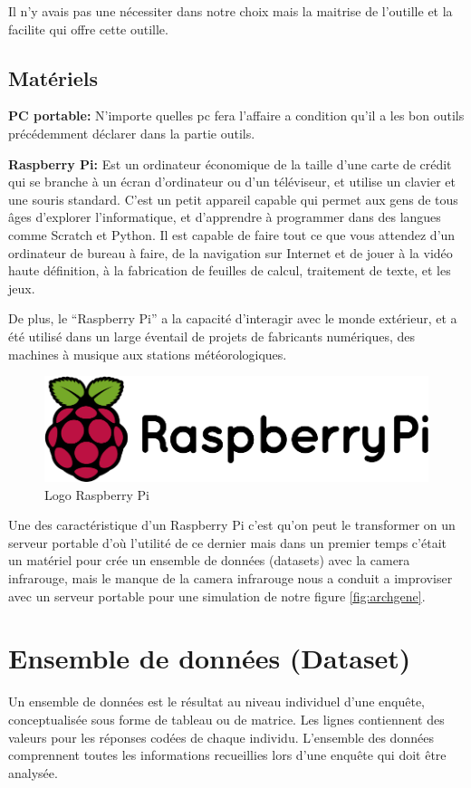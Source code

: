 \documentclass[12pt]{article}
\begin{document}
Il n’y avais pas une nécessiter dans notre choix mais la maitrise de l’outille et la facilite qui offre cette outille.
\subsection{Matériels}
\textbf{PC portable:} N’importe quelles pc fera l’affaire a condition qu’il a les bon outils précédemment déclarer dans la partie outils.

\textbf{Raspberry Pi:} Est un ordinateur économique de la taille d’une carte de crédit qui se branche à un écran d’ordinateur ou d’un téléviseur, et utilise un clavier et une souris standard. C’est un petit appareil capable qui permet aux gens de tous âges d’explorer l’informatique, et d’apprendre à programmer dans des langues comme Scratch et Python. Il est capable de faire tout ce que vous attendez d’un ordinateur de bureau à faire, de la navigation sur Internet et de jouer à la vidéo haute définition, à la fabrication de feuilles de calcul, traitement de texte, et les jeux.


De plus, le “Raspberry Pi” a la capacité d’interagir avec le monde extérieur, et a été utilisé dans un large éventail de projets de fabricants numériques, des machines à musique aux stations météorologiques.

\begin{figure}[h]
	\centering
	\includegraphics[width=12cm]{img-Chapiter-4/raspberry.png}
	\caption{Logo Raspberry Pi}
\end{figure}

Une des caractéristique d’un Raspberry Pi c’est qu’on peut le transformer on un serveur portable d'où l’utilité de ce dernier mais dans un premier temps c’était un matériel pour crée un ensemble de données (datasets) avec la camera infrarouge, mais le manque de la camera infrarouge nous a conduit a improviser avec un serveur portable pour une simulation de notre figure \ref{fig:archgene}.

\section{Ensemble de données (Dataset)}
Un ensemble de données est le résultat au niveau individuel d’une enquête, conceptualisée sous forme de tableau ou de matrice. Les lignes contiennent des valeurs pour les réponses codées de chaque individu. L’ensemble des données comprennent toutes les informations recueillies lors d'une enquête qui doit être analysée.
\end{document}
